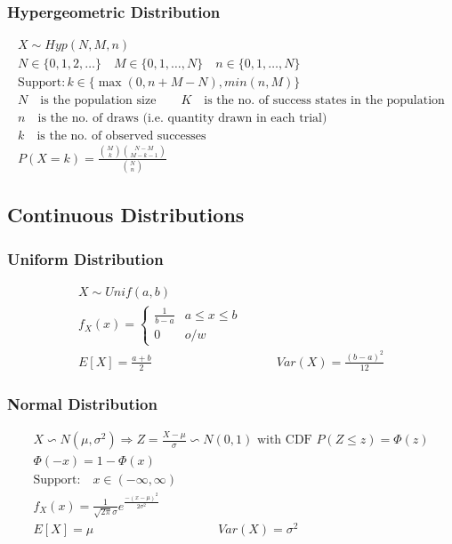 \subsubsection*{Hypergeometric Distribution}
\begin{tcolorbox}
	\begin{gather*}
		X \sim Hyp(N, M, n)\\
		N \in \{0, 1, 2, \ldots \} \quad M \in \{0, 1, \ldots, N\} \quad n \in \{0, 1, \ldots, N\}\\
		\text{Support}: k \in \{\max(0, n + M - N), min(n, M)\}\\
		N \quad \text{is the population size}\qquad
		K \quad\text{is the no. of success states in the population}\\
		n \quad\text{is the no. of draws (i.e. quantity drawn in each trial)}\\
		k \quad\text{is the no. of observed successes}\\
		P(X = k) = \frac{\binom{M}{k} \binom{N - M}{M - k - 1}}{\binom{N}{n}}
	\end{gather*}
\end{tcolorbox}
\subsection*{Continuous Distributions}
\subsubsection*{Uniform Distribution}
\begin{tcolorbox}
	\begin{gather*}
		X \sim Unif(a,b)\\
		f_X(x) = 
		\begin{cases}
			\frac{1}{b-a} & a \leq x \leq b\\
			0 & o/w
		\end{cases}\\
		E[X] = \frac{a + b}{2} \hspace{10em} Var(X) = \frac{(b-a)^2}{12}
	\end{gather*}
\end{tcolorbox}
\subsubsection*{Normal Distribution}
\begin{tcolorbox}
	\begin{gather*}
	X \backsim N(\mu, \sigma^2) \Rightarrow Z = \frac{X- \mu}{\sigma} \backsim N(0,1) \text{ with CDF } P(Z \leq z) = \Phi(z)\\
	\Phi(-x) = 1 - \Phi(x) \\
	\text{Support:} \quad x \in (-\infty, \infty)\\
	f_X(x) = \frac{1}{\sqrt{2\pi} \sigma}e^{\frac{-(x - \mu)^2}{2\sigma^2}}\\
	E[X] = \mu \hspace{10em} Var(X) = \sigma^2
\end{gather*}
\end{tcolorbox}
